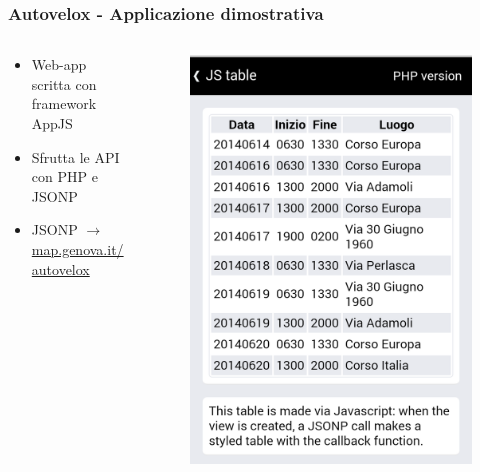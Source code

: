 \documentclass{beamer}
\begin{document}
\begin{frame}
\frametitle{Autovelox - Applicazione dimostrativa} 
\begin{columns}
\begin{column}{6cm}
\begin{itemize}
\item Web-app scritta con framework AppJS
\item Sfrutta le API con PHP e JSONP
\item JSONP $\rightarrow$ \href{http://map.genova.it/autovelox/}{map.genova.it/autovelox}
\end{itemize}
\end{column}
\begin{column}{4cm}
\begin{figure}
\includegraphics[width=\textwidth]{../img/autovelox_m3.png} 
\end{figure}
\end{column}
\end{columns}
\end{frame}
\end{document}
